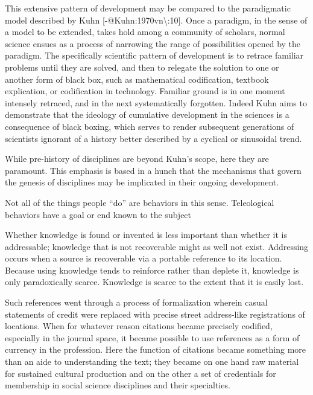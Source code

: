 \documentclass [PhD] {uclathes}
\begin{document}
This extensive pattern of development may be compared to the
paradigmatic model described by Kuhn
{[}-@Kuhn:1970vn\textbackslash{}:10{]}. Once a paradigm, in the sense of
a model to be extended, takes hold among a community of scholars, normal
science ensues as a process of narrowing the range of possibilities
opened by the paradigm. The specifically scientific pattern of
development is to retrace familiar problems until they are solved, and
then to relegate the solution to one or another form of black box, such
as mathematical codification, textbook explication, or codification in
technology. Familiar ground is in one moment intensely retraced, and in
the next systematically forgotten. Indeed Kuhn aims to demonstrate that
the ideology of cumulative development in the sciences is a consequence
of black boxing, which serves to render subsequent generations of
scientists ignorant of a history better described by a cyclical or
sinusoidal trend.

While pre-history of disciplines are beyond Kuhn's scope, here they are
paramount. This emphasis is based in a hunch that the mechanisms that
govern the genesis of disciplines may be implicated in their ongoing
development.

Not all of the things people ``do'' are behaviors in this sense.
Teleological behaviors have a goal or end known to the subject

Whether knowledge is found or invented is less important than whether it
is addressable; knowledge that is not recoverable might as well not
exist. Addressing occurs when a source is recoverable via a portable
reference to its location. Because using knowledge tends to reinforce
rather than deplete it, knowledge is only paradoxically scarce.
Knowledge is scarce to the extent that it is easily lost.

Such references went through a process of formalization wherein casual
statements of credit were replaced with precise street address-like
registrations of locations. When for whatever reason citations became
precisely codified, especially in the journal space, it became possible
to use references as a form of currency in the profession. Here the
function of citations became something more than an aide to
understanding the text; they became on one hand raw material for
sustained cultural production and on the other a set of credentials for
membership in social science disciplines and their specialties.
\end{document}
